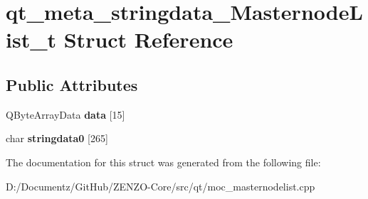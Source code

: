 \hypertarget{structqt__meta__stringdata___masternode_list__t}{}\section{qt\+\_\+meta\+\_\+stringdata\+\_\+\+Masternode\+List\+\_\+t Struct Reference}
\label{structqt__meta__stringdata___masternode_list__t}
\subsection*{Public Attributes}
\begin{DoxyCompactItemize}
\item 
\mbox{\label{structqt__meta__stringdata___masternode_list__t_a0fa573c6eb72bf1b9973a62c8a3fb6ea}} 
Q\+Byte\+Array\+Data {\bfseries data} \mbox{[}15\mbox{]}
\item 
\mbox{\label{structqt__meta__stringdata___masternode_list__t_a35619e2cabf60ba730810507f4f18f73}} 
char {\bfseries stringdata0} \mbox{[}265\mbox{]}
\end{DoxyCompactItemize}


The documentation for this struct was generated from the following file\+:\begin{DoxyCompactItemize}
\item 
D\+:/\+Documentz/\+Git\+Hub/\+Z\+E\+N\+Z\+O-\/\+Core/src/qt/moc\+\_\+masternodelist.\+cpp\end{DoxyCompactItemize}

